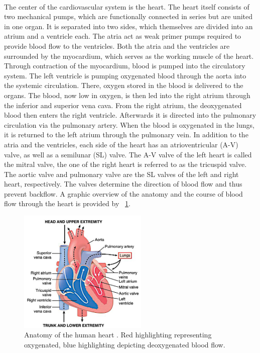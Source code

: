  \\The center of the cardiovascular system is the heart. The heart itself consists of two mechanical pumps, which are functionally connected in series but are united in one organ. It is separated into two sides, which themselves are divided into an atrium and a ventricle each. The atria act as weak primer pumps required to provide blood flow to the ventricles. \cite{HKS4} Both the atria and the ventricles are surrounded by the myocardium, which serves as the working muscle of the heart. Through contraction of the myocardium, blood is pumped into the circulatory system. \cite{HKS7} The left ventricle is pumping oxygenated blood through the aorta into the systemic circulation. There, oxygen stored in the blood is delivered to the organs. The blood, now low in oxygen, is then led into the right atrium through the inferior and superior vena cava. From the right atrium, the deoxygenated blood then enters the right ventricle. Afterwards it is directed into the pulmonary circulation via the pulmonary artery. When the blood is oxygenated in the lungs, it is returned to the left atrium through the pulmonary vein. \cite{HKS4} In addition to the atria and the ventricles, each side of the heart has an atrioventricular (A-V) valve, as well as a semilunar (SL) valve. The A-V valve of the left heart is called the mitral valve, the one of the right heart is referred to as the tricuspid valve. The aortic valve and pulmonary valve are the SL valves of the left and right heart, respectively. The valves determine the direction of blood flow and thus prevent backflow. \cite{HKS7} A graphic overview of the anatomy and the course of blood flow through the heart is provided by \figurename~\ref{fig:heart_anat}.
 \begin{figure}[!ht]
   \centering
   \includegraphics[width=0.55\textwidth]{images/heart_1.jpg}
   \caption[Anatomy of the human heart \cite{GH20}]{Anatomy of the human heart \cite{GH20}. Red highlighting representing oxygenated, blue highlighting depicting deoxygenated blood flow.}
   \label{fig:heart_anat}
 \end{figure}
